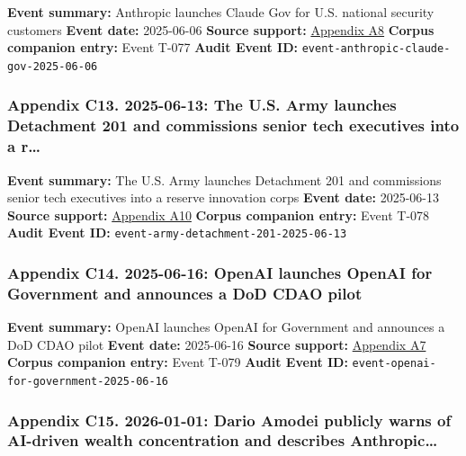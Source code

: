 \documentclass[
  american,
  11pt,
  letterpaper,
]{article}
\begin{document}
\textbf{Event summary:} Anthropic launches Claude Gov for U.S. national
security customers \textbf{Event date:} 2025-06-06 \textbf{Source
support:}
\hyperref[ch-08-appendix-a8-claude-gov-models-for-u-s-national-security-customers]{Appendix
A8} \textbf{Corpus companion entry:} Event T-077 \textbf{Audit Event
ID:} \texttt{event-anthropic-claude-gov-2025-06-06}

\subsubsection{Appendix C13. 2025-06-13: The U.S. Army launches
Detachment 201 and commissions senior tech executives into a
r\ldots{}}\label{ch-08-appendix-c13-2025-06-13-the-u-s-army-launches-detachment-201-and-commissions-senior-tech-executives-into-a-reserve-innovation-corps}

\textbf{Event summary:} The U.S. Army launches Detachment 201 and
commissions senior tech executives into a reserve innovation corps
\textbf{Event date:} 2025-06-13 \textbf{Source support:}
\hyperref[ch-08-appendix-a10-army-launches-detachment-201-executive-innovation-corps-to-drive-tech-transformation]{Appendix
A10} \textbf{Corpus companion entry:} Event T-078 \textbf{Audit Event
ID:} \texttt{event-army-detachment-201-2025-06-13}

\subsubsection{Appendix C14. 2025-06-16: OpenAI launches OpenAI for
Government and announces a DoD CDAO
pilot}\label{ch-08-appendix-c14-2025-06-16-openai-launches-openai-for-government-and-announces-a-dod-cdao-pilot}

\textbf{Event summary:} OpenAI launches OpenAI for Government and
announces a DoD CDAO pilot \textbf{Event date:} 2025-06-16
\textbf{Source support:}
\hyperref[ch-08-appendix-a7-introducing-openai-for-government]{Appendix
A7} \textbf{Corpus companion entry:} Event T-079 \textbf{Audit Event
ID:} \texttt{event-openai-for-government-2025-06-16}

\subsubsection{Appendix C15. 2026-01-01: Dario Amodei publicly warns of
AI-driven wealth concentration and describes
Anthropic\ldots{}}\label{ch-08-appendix-c15-2026-01-01-dario-amodei-publicly-warns-of-ai-driven-wealth-concentration-and-describes-anthropic-s-80-wealth-pledge}
\end{document}

